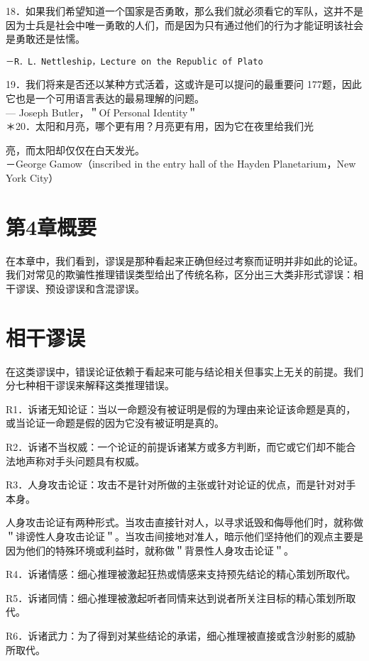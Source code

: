 18．如果我们希望知道一个国家是否勇敢，那么我们就必须看它的军队，这并不是因为士兵是社会中唯一勇敢的人们，而是因为只有通过他们的行为才能证明该社会是勇敢还是怯懦。

\begin{verbatim}
－R．L．Nettleship，Lecture on the Republic of Plato
\end{verbatim}

19．我们将来是否还以某种方式活着，这或许是可以提问的最重要问 177题，因此它也是一个可用语言表达的最易理解的问题。\\
— Joseph Butler，＂Of Personal Identity＂\\
＊20．太阳和月亮，哪个更有用？月亮更有用，因为它在夜里给我们光

亮，而太阳却仅仅在白天发光。\\
－George Gamow（inscribed in the entry hall of the Hayden Planetarium，New York City）

\section*{第4章概要}
在本章中，我们看到，谬误是那种看起来正确但经过考察而证明并非如此的论证。我们对常见的欺骗性推理错误类型给出了传统名称，区分出三大类非形式谬误：相干谬误、预设谬误和含混谬误。

\section*{相干谬误}
在这类谬误中，错误论证依赖于看起来可能与结论相关但事实上无关的前提。我们分七种相干谬误来解释这类推理错误。

R1．诉诸无知论证：当以一命题没有被证明是假的为理由来论证该命题是真的，或当论证一命题是假的因为它没有被证明是真的。

R2．诉诸不当权威：一个论证的前提诉诸某方或多方判断，而它或它们却不能合法地声称对手头问题具有权威。

R3．人身攻击论证：攻击不是针对所做的主张或针对论证的优点，而是针对对手本身。

人身攻击论证有两种形式。当攻击直接针对人，以寻求诋毁和侮辱他们时，就称做＂诽谤性人身攻击论证＂。当攻击间接地对准人，暗示他们坚持他们的观点主要是因为他们的特殊环境或利益时，就称做＂背景性人身攻击论证＂。

R4．诉诸情感：细心推理被激起狂热或情感来支持预先结论的精心策划所取代。

R5．诉诸同情：细心推理被激起听者同情来达到说者所关注目标的精心策划所取代。

R6．诉诸武力：为了得到对某些结论的承诺，细心推理被直接或含沙射影的威胁所取代。

